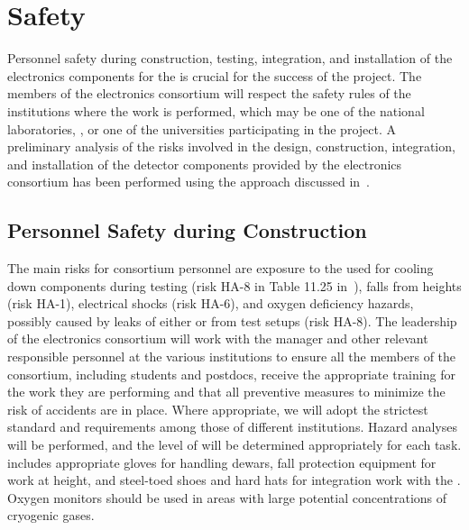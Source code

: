 \section{Safety}
\label{sec:fdsp-tpcelec-safety}

Personnel safety during construction, testing, integration,
and installation of the  electronics components for the 
  is crucial for the success
of the project. The members of the  electronics consortium will
respect the safety rules of the institutions where the work is
performed, which may be one of the national laboratories, ,
or one of the universities participating in the project. A
preliminary analysis of the risks involved in the design,
construction, integration, and installation of the detector
components provided by the  electronics consortium has been
performed using the approach discussed in~\tcchesh.


\subsection{Personnel Safety during Construction}
\label{sec:fdsp-tpcelec-safety-personnel}

The main risks for consortium personnel are exposure to
the \lntwo used for cooling down components during testing (risk HA-8
in Table 11.25 in~\tcchappx), falls from heights (risk HA-1), 
electrical shocks (risk HA-6), and oxygen deficiency hazards, possibly 
caused by leaks of either \lntwo or  from test setups (risk HA-8).
The leadership of the
 electronics consortium will work with the 
 manager and other relevant responsible personnel at the
various institutions to ensure all the members of the
consortium, including students and postdocs, receive the appropriate training for the work they
are performing and that all preventive measures to minimize
the risk of accidents are in place. Where appropriate,
we will adopt the strictest standard and requirements among
those of different institutions. Hazard analyses will be performed,
and the level of  will be determined
appropriately for each task.  includes 
appropriate gloves for handling \lntwo dewars, fall
protection equipment for work at height, and steel-toed shoes and
hard hats for integration work with the . Oxygen
monitors should be used in areas with large potential concentrations of
cryogenic gases.

